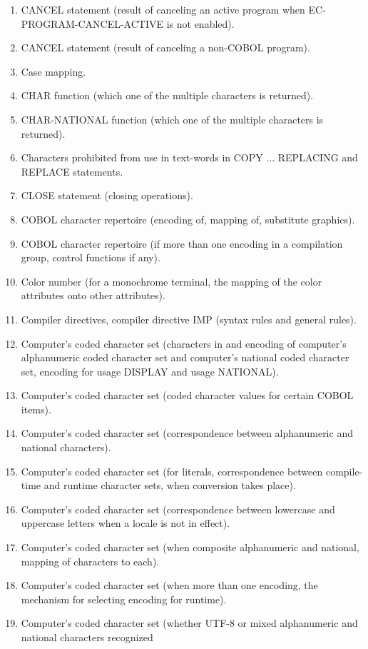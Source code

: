 \begin{enumerate}
\item CANCEL statement (result of canceling an active program when EC-PROGRAM-CANCEL-ACTIVE is not
  enabled).
\item CANCEL statement (result of canceling a non-COBOL program).
\item Case mapping.
\item CHAR function (which one of the multiple characters is returned).
\item CHAR-NATIONAL function (which one of the multiple characters is returned).
\item Characters prohibited from use in text-words in COPY ... REPLACING and REPLACE statements.
\item CLOSE statement (closing operations).
\item COBOL character repertoire (encoding of, mapping of, substitute graphics).
\item COBOL character repertoire (if more than one encoding in a compilation group, control functions if any).
\item Color number (for a monochrome terminal, the mapping of the color attributes onto other attributes).
\item Compiler directives, compiler directive IMP (syntax rules and general rules).
\item Computer's coded character set (characters in and encoding of computer’s alphanumeric coded character set and computer’s national coded character set, encoding for usage DISPLAY and usage NATIONAL).
\item Computer's coded character set (coded character values for certain COBOL items).
\item Computer's coded character set (correspondence between alphanumeric and national characters).
\item Computer's coded character set (for literals, correspondence between compile-time and runtime character sets, when conversion takes place).
\item Computer's coded character set (correspondence between lowercase and uppercase letters when a locale is not in effect).
\item Computer's coded character set (when composite alphanumeric and national, mapping of characters to each).
\item Computer's coded character set (when more than one encoding, the mechanism for selecting encoding for runtime).
\item Computer's coded character set (whether UTF-8 or mixed alphanumeric and national characters recognized

\end{enumerate}
